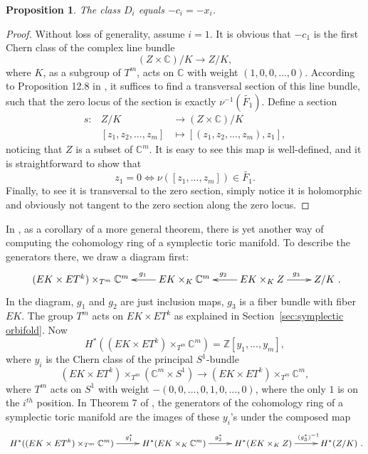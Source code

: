 \documentclass[12pt]{amsart}
\def\Z {{\mathbb{Z}}}
\def\C {{\mathbb{C}}}
\newtheorem{proposition}[theorem]{Proposition}
\theoremstyle{definition}
\numberwithin{equation}{section}
\begin{document}
\begin{proposition}\label{prop:Poincare dual}
The class $D_{i}$ equals $-c_{i}=-x_{i}$.
\end{proposition}
\begin{proof}
Without loss of generality, assume $i=1$. It is obvious that
$-c_{1}$ is the first Chern class of the complex line bundle
\begin{equation}
(Z\times \C)/K\rightarrow Z/K,
\end{equation}
where $K$, as a subgroup of $T^m$, acts on $\C$ with weight
$(1,0,0,...,0)$. According to Proposition 12.8 in \cite{BT:book}, it
suffices to find a transversal section of this line bundle, such
that the zero locus of the section is exactly
$\nu^{-1}(\tilde{F_{1}})$. Define a section
\begin{eqnarray*}
s: &Z/K & \rightarrow (Z\times \C)/K\\
&   [z_{1},z_{2},...,z_{m}]&\mapsto [(z_{1},z_{2},...,z_{m}),z_{1}],
\end{eqnarray*}
noticing that $Z$ is a subset of $\C^m$. It is easy to see this map
is well-defined, and it is straightforward to show that
\begin{equation}
z_{1}=0 \Leftrightarrow \nu([z_{1},...,z_{m}])\in \tilde{F_{1}}.
\end{equation}
Finally, to see it is transversal to the zero section, simply notice
it is holomorphic and obviously not tangent to the zero section
along the zero locus.
\end{proof}

In \cite{TW:quotients}, as a corollary of a more general theorem,
there is yet another way of computing the cohomology ring of a
symplectic toric manifold. To describe the generators there, we draw
a diagram first:
\begin{equation}
\xymatrix{
  (EK\times ET^k)\times_{T^m}\C^m & EK\times_{K}\C^m \ar[l]_(0.4){g_{1}} & EK\times_{K}Z \ar[l]_{g_{2}} \ar[r]^(0.55){g_{3}}& Z/K
  }.
\end{equation}
In the diagram, $g_{1}$ and $g_{2}$ are just inclusion maps, $g_{3}$
is a fiber bundle with fiber $EK$. The group $T^m$ acts on $EK\times
ET^k$ as explained in Section~\ref{sec:symplectic orbifold}. Now
\begin{equation}H^{*}((EK\times ET^k)\times_{T^m}\C^m) =
\Z[y_{1},...,y_{m}],\end{equation} where $y_{i}$ is the Chern class
of the principal $S^1$-bundle
\begin{equation}
(EK\times ET^k)\times_{T^m}(\C^m\times S^1)\rightarrow (EK\times
ET^k)\times_{T^m}\C^m,
\end{equation}
where $T^m$ acts on $S^1$ with weight $-(0,0,...,0,1,0,...,0)$,
where the only $1$ is on the $i^{th}$ position. In Theorem 7 of
\cite{TW:quotients}, the generators of the cohomology ring of a
symplectic toric manifold are the images of these $y_{i}$'s under
the composed map
\begin{equation}\small
\xymatrix{ H^{*}((EK\times ET^k)\times_{T^m}\C^m)
\ar[r]^(0.6){g_{1}^{*}} & H^{*}(EK\times_{K}\C^m) \ar[r]^{g_{2}^{*}}
& H^{*}(EK\times_{K}Z) \ar[r]^(0.6){(g_{3}^{*})^{-1}} & H^{*}(Z/K)
}.
\end{equation}
\end{document}
